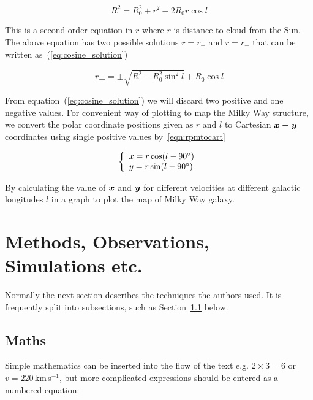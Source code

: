 \documentclass[fleqn,usenatbib]{mnras}
\begin{document}
\begin{equation}
 \mathit{R}^{2}=\mathit{R}_{0}^{2}+\mathit{r}^{2}-2\mathit{R}_{0}\mathit{r}\cos l
 \label{eq:cosine_theory}
\end{equation}

This is a second-order equation in $\mathit{r}$ where $\mathit{r}$ is distance to cloud from the Sun. The above equation has two possible solutions $\mathit{r}=\mathit{r}_{+}$ and $\mathit{r}=\mathit{r}_{-}$ that can be written as~(\ref{eq:cosine_solution})

\begin{equation}
 \mathit{r}\pm=\pm\sqrt{\mathit{R}^{2}-\mathit{R}_{0}^{2}\sin^{2} l}+\mathit{R}_{0}\cos l
 \label{eq:cosine_solution}
\end{equation}

From equation~(\ref{eq:cosine_solution}) we will discard two positive and one negative values. For convenient way of plotting to map the Milky Way structure, we convert the polar coordinate positions given as $\mathit{r}$ and $\mathit{l}$ to Cartesian $\bmath{x-y}$ coordinates using single positive values by~\ref{eqn:rpmtocart}

\begin{equation}
\left\lbrace
\begin{array}{l}
	x=r \cos (l-90\hbox{$^\circ$}) \\
	y=r \sin (l-90\hbox{$^\circ$}) \\
\end{array}
\right.
\label{eqn:rpmtocart}
\end{equation}

By calculating the value of $\bmath{x}$ and $\bmath{y}$ for different velocities at different galactic longitudes $\mathit{l}$ in a graph to plot the map of Milky Way galaxy.

\section{Methods, Observations, Simulations etc.}

Normally the next section describes the techniques the authors used.
It is frequently split into subsections, such as Section~\ref{sec:maths} below.

\subsection{Maths}
\label{sec:maths} %

Simple mathematics can be inserted into the flow of the text e.g. $2\times3=6$
or $v=220$\,km\,s$^{-1}$, but more complicated expressions should be entered
as a numbered equation:
\end{document}
